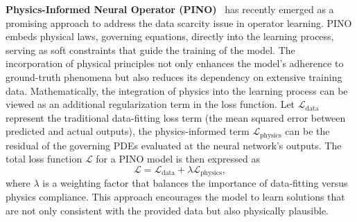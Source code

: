 \textbf{Physics-Informed Neural Operator (PINO)}~\citep{wang2021learning,li2021physics}  has recently emerged as a promising approach to address the data scarcity issue in operator learning.
PINO embeds physical laws, \eg governing equations, directly into the learning process, serving as soft constraints that guide the training of the model. The incorporation of physical principles not only enhances the model's adherence to ground-truth phenomena but also reduces its dependency on extensive training data. 
Mathematically, the integration of physics into the learning process can be viewed as an additional regularization term in the loss function. Let \(\mathcal{L}_\text{data}\) represent the traditional data-fitting loss term (\eg the mean squared error between predicted and actual outputs), the physics-informed term \(\mathcal{L}_\text{physics}\) can be the residual of the governing PDEs evaluated at the neural network's outputs. The total loss function \(\mathcal{L}\) for a PINO model is then expressed as
\[ \mathcal{L} = \mathcal{L}_\text{data} + \lambda \mathcal{L}_\text{physics}, \]
where \(\lambda\) is a weighting factor that balances the importance of data-fitting versus physics compliance. This approach encourages the model to learn solutions that are not only consistent with the provided data but also physically plausible.



